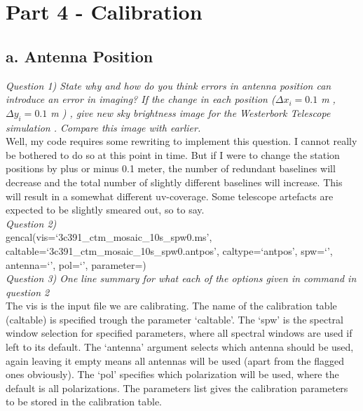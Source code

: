 \documentclass[12pt, a4paper]{article}
\begin{document}
\section{Part 4 - Calibration}
\subsection{a. Antenna Position}
\noindent \textit{Question 1) State why and how do you think errors in antenna position can introduce an error in imaging? If the change in each position ($\Delta x_i = 0.1$ m , $\Delta y_i = 0.1$ m ) , give new sky brightness image for the Westerbork Telescope simulation . Compare this image with earlier. } \\
Well, my code requires some rewriting to implement this question. I cannot really be bothered to do so at this point in time. But if I were to change the station positions by plus or minus 0.1 meter, the number of redundant baselines will decrease and the total number of slightly different baselines will increase. This will result in a somewhat different uv-coverage. Some telescope artefacts are expected to be slightly smeared out, so to say. \\

\noindent \textit{Question 2) } \\
gencal(vis=`3c391\_ctm\_mosaic\_10s\_spw0.ms', caltable=`3c391\_ctm\_mosaic\_10s\_spw0.antpos', caltype=`antpos', spw=`', antenna=`', pol=`', parameter=\lbrack \rbrack) \\

\noindent \textit{Question 3) One line summary for what each of the options given in command in question 2} \\
The vis is the input file we are calibrating. The name of the calibration table (caltable) is specified trough the parameter `caltable'. The `spw' is the spectral window selection for specified parameters, where all spectral windows are used if left to its default. The `antenna' argument selects which antenna should be used, again leaving it empty means all antennas will be used (apart from the flagged ones obviously). The `pol' specifies which polarization will be used, where the default is all polarizations. The parameters list gives the calibration parameters to be stored in the calibration table. \\
\end{document}

